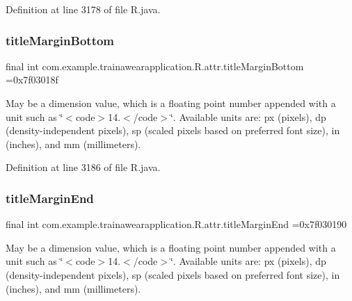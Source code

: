 Definition at line 3178 of file R.\+java.

\mbox{\label{classcom_1_1example_1_1trainawearapplication_1_1_r_1_1attr_a973e482fdf6d971c3c6d041f403ea72d}} 
\subsubsection{\texorpdfstring{titleMarginBottom}{titleMarginBottom}}
{\footnotesize\ttfamily final int com.\+example.\+trainawearapplication.\+R.\+attr.\+title\+Margin\+Bottom =0x7f03018f\hspace{0.3cm}{\ttfamily [static]}}

May be a dimension value, which is a floating point number appended with a unit such as \char`\"{}$<$code$>$14.\+5sp$<$/code$>$\char`\"{}. Available units are\+: px (pixels), dp (density-\/independent pixels), sp (scaled pixels based on preferred font size), in (inches), and mm (millimeters). 

Definition at line 3186 of file R.\+java.

\mbox{\label{classcom_1_1example_1_1trainawearapplication_1_1_r_1_1attr_a9888cd8bb9187fa5f389980f1815eb03}} 
\subsubsection{\texorpdfstring{titleMarginEnd}{titleMarginEnd}}
{\footnotesize\ttfamily final int com.\+example.\+trainawearapplication.\+R.\+attr.\+title\+Margin\+End =0x7f030190\hspace{0.3cm}{\ttfamily [static]}}

May be a dimension value, which is a floating point number appended with a unit such as \char`\"{}$<$code$>$14.\+5sp$<$/code$>$\char`\"{}. Available units are\+: px (pixels), dp (density-\/independent pixels), sp (scaled pixels based on preferred font size), in (inches), and mm (millimeters). 

